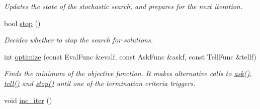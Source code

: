 \begin{DoxyCompactItemize}
\begin{DoxyCompactList}\small\item\em Updates the state of the stochastic search, and prepares for the next iteration. \end{DoxyCompactList}\item 
bool \hyperlink{classlibcmaes_1_1ESOStrategy_aa99c52d17342902cc4dc9a863deb58e3}{stop} ()
\begin{DoxyCompactList}\small\item\em Decides whether to stop the search for solutions. \end{DoxyCompactList}\item 
int \hyperlink{classlibcmaes_1_1ESOStrategy_ab56253c2d7753bf42c11b20a0b543b8d}{optimize} (const Eval\-Func \&evalf, const Ask\-Func \&askf, const Tell\-Func \&tellf)
\begin{DoxyCompactList}\small\item\em Finds the minimum of the objective function. It makes alternative calls to \hyperlink{classlibcmaes_1_1ESOStrategy_af614d71ca3e8353b3027723220c9e3b4}{ask()}, \hyperlink{classlibcmaes_1_1ESOStrategy_ad35926877abdaed3922b316f57723612}{tell()} and \hyperlink{classlibcmaes_1_1ESOStrategy_aa99c52d17342902cc4dc9a863deb58e3}{stop()} until one of the termination criteria triggers. \end{DoxyCompactList}\item 
\hypertarget{classlibcmaes_1_1ESOStrategy_a8eda694f97058ca603f8f31e5bb1bc05}{void \hyperlink{classlibcmaes_1_1ESOStrategy_a8eda694f97058ca603f8f31e5bb1bc05}{inc\-\_\-iter} ()}\label{classlibcmaes_1_1ESOStrategy_a8eda694f97058ca603f8f31e5bb1bc05}


\end{DoxyCompactItemize}
